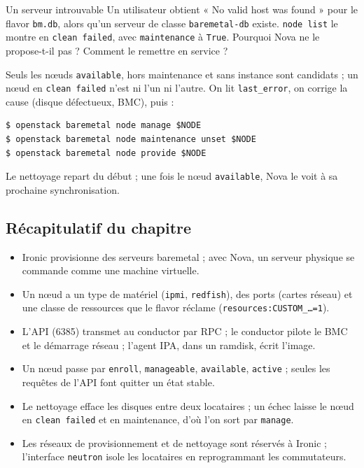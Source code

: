 \begin{exercice}{Un serveur introuvable}\label{ex:ir-clean}
Un utilisateur obtient « No valid host was found » pour le flavor \texttt{bm.db}, alors qu'un serveur de classe
\texttt{baremetal-db} existe. \texttt{node list} le montre en \texttt{clean failed}, avec \texttt{maintenance} à \texttt{True}.
Pourquoi Nova ne le propose-t-il pas ? Comment le remettre en service ?
\end{exercice}
\begin{correction}
Seuls les nœuds \texttt{available}, hors maintenance et sans instance sont candidats ; un nœud en \texttt{clean failed} n'est
ni l'un ni l'autre. On lit \texttt{last\_error}, on corrige la cause (disque défectueux, BMC), puis :
\begin{lstlisting}
$ openstack baremetal node manage $NODE
$ openstack baremetal node maintenance unset $NODE
$ openstack baremetal node provide $NODE
\end{lstlisting}
Le nettoyage repart du début ; une fois le nœud \texttt{available}, Nova le voit à sa prochaine synchronisation.
\end{correction}

\subsection{Récapitulatif du chapitre}\label{sec:ir-recap}

\begin{aretenir}
\begin{itemize}
  \item Ironic provisionne des serveurs \gls{baremetal} ; avec Nova, un serveur physique se commande comme une machine virtuelle.
  \item Un nœud a un type de matériel (\texttt{ipmi}, \texttt{redfish}), des ports (cartes réseau) et une classe de ressources
        que le flavor réclame (\texttt{resources:CUSTOM\_\dots=1}).
  \item L'API (6385) transmet au conductor par RPC ; le conductor pilote le BMC et le démarrage réseau ; l'agent IPA, dans un
        ramdisk, écrit l'image.
  \item Un nœud passe par \texttt{enroll}, \texttt{manageable}, \texttt{available}, \texttt{active} ; seules les requêtes de
        l'API font quitter un état stable.
  \item Le nettoyage efface les disques entre deux locataires ; un échec laisse le nœud en \texttt{clean failed} et en
        maintenance, d'où l'on sort par \texttt{manage}.
  \item Les réseaux de provisionnement et de nettoyage sont réservés à Ironic ; l'interface \texttt{neutron} isole les
        locataires en reprogrammant les commutateurs.
\end{itemize}
\end{aretenir}

